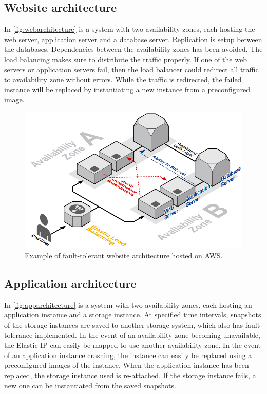 \documentclass[11pt]{report}
\begin{document}
\subsection{Website architecture}
In \autoref{fig:webarchitecture} is a system with two availability zones, each hosting the web server, application server and a database server. Replication is setup between the databases. Dependencies between the availability zones has been avoided. The load balancing makes sure to distribute the traffic properly. If one of the web servers or application servers fail, then the load balancer could redirect all traffic to availability zone without errors. While the traffic is redirected, the failed instance will be replaced by instantiating a new instance from a preconfigured image.

\begin{figure}[H]
\centering
\includegraphics[scale=0.5]{../GFX/aws_architecture_web.jpg}
\caption[Example of fault-tolerant website architecture hosted on AWS]{Example of fault-tolerant website architecture hosted on AWS\cite{AWS_ac_ra_ftha_04}.}
\label{fig:webarchitecture}
\end{figure}

\subsection{Application architecture}
In \autoref{fig:apparchitecture} is a system with two availability zones, each hosting an application instance and a storage instance. At specified time intervals, snapshots of the storage instances are saved to another storage system, which also has fault-tolerance implemented. In the event of an availability zone becoming unavailable, the Elastic IP can easily be mapped to use another availability zone. In the event of an application instance crashing, the instance can easily be replaced using a preconfigured images of the instance. When the application instance has been replaced, the storage instance used is re-attached. If the storage instance fails, a new one can be instantiated from the saved snapshots.
\end{document}
